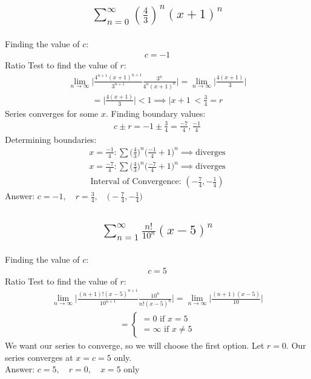 \documentclass{article}
\begin{document}
\subsection{
	\begin{align*}
		\sum_{n = 0}^\infty \left( \frac{4}{3} \right)^n (x + 1)^n
	\end{align*}
}
Finding the value of $c$: 
\begin{align*}
	c = -1
\end{align*}
Ratio Test to find the value of $r$:
\begin{align*}
	\lim_{n \to \infty} \bigg| \frac{4^{n + 1}(x + 1)^{n + 1}}{3^{n + 1}} \frac{3^n}{4^n (x + 1)^n} \bigg| = \lim_{n \to \infty} \bigg| \frac{4(x + 1)}{3} \bigg|
\end{align*}
\begin{align*}
	= \bigg| \frac{4(x + 1)}{3} \bigg| < 1 \implies |x + 1\ < \frac{3}{4} = r
\end{align*}
Series converges for some $x$. Finding boundary values:
\begin{align*}
	c \pm r = -1 \pm \frac{3}{4} = \frac{-7}{4}, \frac{-1}{4}
\end{align*}
Determining boundaries:
\begin{align*}
	x = \frac{-1}{4}: \sum \bigg( \frac{4}{3} \bigg)^n \bigg( \frac{-1}{4} + 1 \bigg)^n \implies \text{diverges}
\end{align*}
\begin{align*}
	x = \frac{-7}{4}: \sum \bigg( \frac{4}{3} \bigg)^n \bigg( \frac{-7}{4} + 1 \bigg)^n \implies \text{diverges}
\end{align*}
\begin{align*}
	\text{Interval of Convergence: } (-\frac{7}{4}, -\frac{1}{4})
\end{align*}
Answer: $c = -1, \quad r = \frac{3}{4}, \quad \bigg( -\frac{7}{4}, -\frac{1}{4} \bigg)$

\subsection{
	\begin{align*}
		\sum_{n = 1}^\infty \frac{n!}{10^n} (x - 5)^n
	\end{align*}
}
Finding the value of $c$:
\begin{align*}
	c = 5
\end{align*}
Ratio Test to find the value of $r$:
\begin{align*}
	\lim_{n \to \infty} \bigg| \frac{(n + 1)! (x - 5)^{n + 1}}{10^{n + 1}} \frac{10^n}{n!(x - 5)^n} \bigg| = \lim_{n \to \infty} \bigg| \frac{(n + 1) (x - 5)}{10} \bigg|
\end{align*}
\begin{align*}
	=
	\begin{cases}
		= 0 \text{ if } x = 5 \\
		= \infty \text{ if } x \neq 5
	\end{cases}
\end{align*}
We want our series to converge, so we will choose the first option. Let $r = 0$. Our series converges at $x = c = 5$ only. \\[10pt]
Answer: $c = 5, \quad r = 0, \quad x = 5$ only
\end{document}
